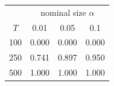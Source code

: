 % 
\begin{tabular}{cccc}
  \hline
  & \multicolumn{3}{c}{nominal size $\alpha$} \\
 $T$ & 0.01 & 0.05 & 0.1 \\
 \hline
100 & 0.000 & 0.000 & 0.000 \\ 
  250 & 0.741 & 0.897 & 0.950 \\ 
  500 & 1.000 & 1.000 & 1.000 \\ 
   \hline
\end{tabular}
